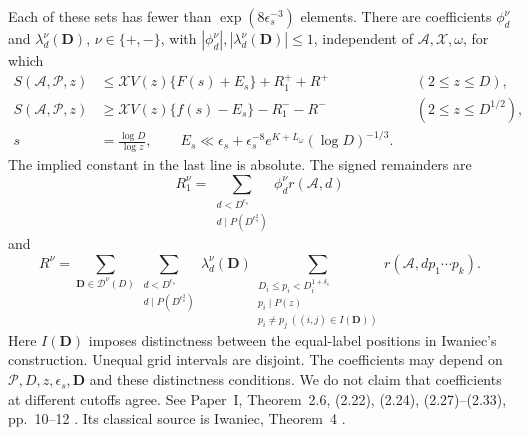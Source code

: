 \begin{fact}
\begin{equation}
\end{equation}
Each of these sets has fewer than $\exp(8\epsilon_s^{-3})$ elements.
There are coefficients $\phi_d^\nu$ and $\lambda_d^\nu(\mathbf D)$,
$\nu\in\{+,-\}$, with $|\phi_d^\nu|,|\lambda_d^\nu(\mathbf D)|\le1$, independent of
$\mathcal A,\mathcal X,\omega$, for which
\begin{equation}\label{eq:classical-structured-sieve}
 \begin{aligned}
 S(\mathcal A,\mathcal P,z)&\le \mathcal X V(z)\{F(s)+E_s\}+R_1^++R^+
                   &&(2\le z\le D),\\
 S(\mathcal A,\mathcal P,z)&\ge \mathcal X V(z)\{f(s)-E_s\}-R_1^--R^-
                   &&(2\le z\le D^{1/2}),\\
 s&=\frac{\log D}{\log z},\qquad
 E_s\ll\epsilon_s+\epsilon_s^{-8}e^{K+L_\omega}(\log D)^{-1/3}.
 \end{aligned}
\end{equation}
The implied constant in the last line is absolute. The signed remainders are
\begin{equation}\label{eq:classical-smooth-remainder}
 R_1^\nu=\sum_{\substack{d<D^{\epsilon_s}\\
                        d\mid P(D^{\epsilon_s^2})}}
                  \phi_d^\nu r(\mathcal A,d)
\end{equation}
and
\begin{equation}\label{eq:classical-tail-remainder}
 R^\nu=\sum_{\mathbf D\in\mathcal D^\nu(D)}
 \sum_{\substack{d<D^{\epsilon_s}\\d\mid P(D^{\epsilon_s^2})}}
 \lambda_d^\nu(\mathbf D)
 \sum_{\substack{D_i\le p_i<D_i^{1+\delta_s}\\p_i\mid P(z)\\
                 p_i\ne p_j\ ((i,j)\in I(\mathbf D))}}
 r(\mathcal A,dp_1\cdots p_k).
\end{equation}
Here $I(\mathbf D)$ imposes distinctness between the equal-label
positions in Iwaniec's construction. Unequal grid intervals are disjoint.
The coefficients may depend on $\mathcal P,D,z,\epsilon_s,\mathbf D$
and these distinctness conditions.
We do not claim that coefficients at different cutoffs agree. See Paper~I, Theorem~2.6,
(2.22), (2.24), (2.27)--(2.33), pp.~10--12
\cite[Theorem~2.6, (2.22), (2.24), (2.27)--(2.33), pp.~10--12]{PaperI}.
Its classical source is Iwaniec, Theorem~4
\cite[Theorem~4]{Iwaniec1980Remainder}.
\end{fact}

